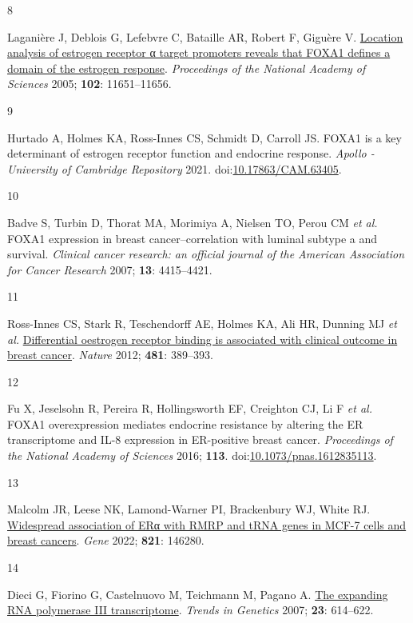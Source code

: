 \documentclass[
  12pt,
]{article}
\newlength{\cslhangindent}
\newlength{\csllabelwidth}
\newlength{\cslentryspacingunit} %
\newenvironment{CSLReferences}[2] %
 {%
  \setlength{\parindent}{0pt}
  \ifodd #1
  \let\oldpar\par
  \def\par{\hangindent=\cslhangindent\oldpar}
  \fi
  \setlength{\parskip}{#2\cslentryspacingunit}
 }%
 {}
\newcommand{\CSLLeftMargin}[1]{\parbox[t]{\csllabelwidth}{#1}}
\newcommand{\CSLRightInline}[1]{\parbox[t]{\linewidth - \csllabelwidth}{#1}\break}
\begin{document}
\begin{CSLReferences}{0}{0}
\leavevmode{}%
\CSLLeftMargin{8 }%
\CSLRightInline{Laganière J, Deblois G, Lefebvre C, Bataille AR, Robert F, Giguère V. \href{https://doi.org/10.1073/pnas.0505575102}{Location analysis of estrogen receptor α target promoters reveals that FOXA1 defines a domain of the estrogen response}. \emph{Proceedings of the National Academy of Sciences} 2005; \textbf{102}: 11651--11656.}

\leavevmode{}%
\CSLLeftMargin{9 }%
\CSLRightInline{Hurtado A, Holmes KA, Ross-Innes CS, Schmidt D, Carroll JS. FOXA1 is a key determinant of estrogen receptor function and endocrine response. \emph{Apollo - University of Cambridge Repository} 2021. doi:\href{https://doi.org/10.17863/CAM.63405}{10.17863/CAM.63405}.}

\leavevmode{}%
\CSLLeftMargin{10 }%
\CSLRightInline{Badve S, Turbin D, Thorat MA, Morimiya A, Nielsen TO, Perou CM \emph{et al.} {FOXA1} expression in breast cancer--correlation with luminal subtype a and survival. \emph{Clinical cancer research: an official journal of the American Association for Cancer Research} 2007; \textbf{13}: 4415--4421.}

\leavevmode{}%
\CSLLeftMargin{11 }%
\CSLRightInline{Ross-Innes CS, Stark R, Teschendorff AE, Holmes KA, Ali HR, Dunning MJ \emph{et al.} \href{https://doi.org/10.1038/nature10730}{Differential oestrogen receptor binding is associated with clinical outcome in breast cancer}. \emph{Nature} 2012; \textbf{481}: 389--393.}

\leavevmode{}%
\CSLLeftMargin{12 }%
\CSLRightInline{Fu X, Jeselsohn R, Pereira R, Hollingsworth EF, Creighton CJ, Li F \emph{et al.} FOXA1 overexpression mediates endocrine resistance by altering the ER transcriptome and IL-8 expression in ER-positive breast cancer. \emph{Proceedings of the National Academy of Sciences} 2016; \textbf{113}. doi:\href{https://doi.org/10.1073/pnas.1612835113}{10.1073/pnas.1612835113}.}

\leavevmode{}%
\CSLLeftMargin{13 }%
\CSLRightInline{Malcolm JR, Leese NK, Lamond-Warner PI, Brackenbury WJ, White RJ. \href{https://doi.org/10.1016/j.gene.2022.146280}{Widespread association of ERα with RMRP and tRNA genes in MCF-7 cells and breast cancers}. \emph{Gene} 2022; \textbf{821}: 146280.}

\leavevmode{}%
\CSLLeftMargin{14 }%
\CSLRightInline{Dieci G, Fiorino G, Castelnuovo M, Teichmann M, Pagano A. \href{https://doi.org/10.1016/j.tig.2007.09.001}{The expanding RNA polymerase III transcriptome}. \emph{Trends in Genetics} 2007; \textbf{23}: 614--622.}


\end{CSLReferences}
\end{document}
